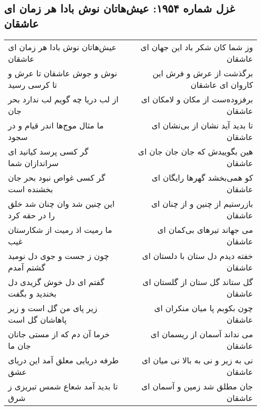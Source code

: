 \begin{center}
\section*{غزل شماره ۱۹۵۴: عیش‌هاتان نوش بادا هر زمان ای عاشقان}
\label{sec:1954}
\begin{longtable}{l p{0.5cm} r}
عیش‌هاتان نوش بادا هر زمان ای عاشقان
&&
وز شما کان شکر باد این جهان ای عاشقان
\\
نوش و جوش عاشقان تا عرش و تا کرسی رسید
&&
برگذشت از عرش و فرش این کاروان ای عاشقان
\\
از لب دریا چه گویم لب ندارد بحر جان
&&
برفزوده‌ست از مکان و لامکان ای عاشقان
\\
ما مثال موج‌ها اندر قیام و در سجود
&&
تا بدید آید نشان از بی‌نشان ای عاشقان
\\
گر کسی پرسد کیانید ای سراندازان شما
&&
هین بگوییدش که جان جان جان ای عاشقان
\\
گر کسی غواص نبود بحر جان بخشنده است
&&
کو همی‌بخشد گهرها رایگان ای عاشقان
\\
این چنین شد وان چنان شد خلق را در حقه کرد
&&
بازرستیم از چنین و از چنان ای عاشقان
\\
ما رمیت اذ رمیت از شکارستان غیب
&&
می جهاند تیرهای بی‌کمان ای عاشقان
\\
چون ز جست و جوی دل نومید گشتم آمدم
&&
خفته دیدم دل ستان با دلستان ای عاشقان
\\
گفتم ای دل خوش گزیدی دل بخندید و بگفت
&&
گل ستاند گل ستان از گلستان ای عاشقان
\\
زیر پای من گل است و زیر پاهاشان گل است
&&
چون بکوبم پا میان منکران ای عاشقان
\\
خرما آن دم که از مستی جانان جان ما
&&
می نداند آسمان از ریسمان ای عاشقان
\\
طرفه دریایی معلق آمد این دریای عشق
&&
نی به زیر و نی به بالا نی میان ای عاشقان
\\
تا بدید آمد شعاع شمس تبریزی ز شرق
&&
جان مطلق شد زمین و آسمان ای عاشقان
\\
\end{longtable}
\end{center}
